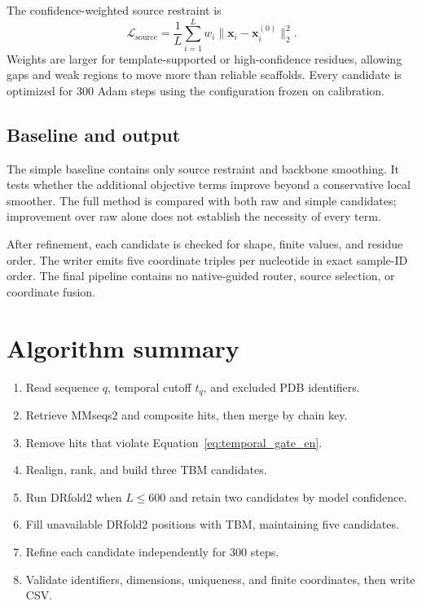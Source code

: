 \documentclass[12pt,a4paper,oneside]{report}
\begin{document}
The confidence-weighted source restraint is
\begin{equation}
\mathcal{L}_{\mathrm{source}}=
\frac{1}{L}\sum_{i=1}^{L}w_i
\lVert\mathbf{x}_i-\mathbf{x}^{(0)}_i\rVert_2^2.
\end{equation}
Weights are larger for template-supported or high-confidence residues, allowing gaps and
weak regions to move more than reliable scaffolds. Every candidate is optimized for 300
Adam steps using the configuration frozen on calibration.

\subsection{Baseline and output}

The simple baseline contains only source restraint and backbone smoothing. It tests
whether the additional objective terms improve beyond a conservative local smoother.
The full method is compared with both raw and simple candidates; improvement over raw
alone does not establish the necessity of every term.

After refinement, each candidate is checked for shape, finite values, and residue order.
The writer emits five coordinate triples per nucleotide in exact sample-ID order. The
final pipeline contains no native-guided router, source selection, or coordinate fusion.

\section{Algorithm summary}

\begin{enumerate}
  \item Read sequence $q$, temporal cutoff $t_q$, and excluded PDB identifiers.
  \item Retrieve MMseqs2 and composite hits, then merge by chain key.
  \item Remove hits that violate Equation~\ref{eq:temporal_gate_en}.
  \item Realign, rank, and build three TBM candidates.
  \item Run DRfold2 when $L\leq600$ and retain two candidates by model confidence.
  \item Fill unavailable DRfold2 positions with TBM, maintaining five candidates.
  \item Refine each candidate independently for 300 steps.
  \item Validate identifiers, dimensions, uniqueness, and finite coordinates, then write CSV.
\end{enumerate}
\end{document}
